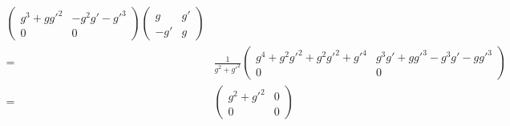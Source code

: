 \begin{frame}
\begin{align}
\begin{pmatrix}
    g^3+g{g'}^2 & -g^2g'-{g'}^3\\
    0   &0
  \end{pmatrix}
\begin{pmatrix}
    g   & g'\\
    -g' & g
  \end{pmatrix}\nonumber\\
=&\frac{1}{g^2+{g'}^2}
  \begin{pmatrix}
    g^4+g^2{g'}^2+g^2{g'}^2+{g'}^4 & g^3g'+g{g'}^3-g^3g'-g{g'}^3\\
    0    &0
  \end{pmatrix}\nonumber\\
=&\begin{pmatrix}
    g^2+{g'}^2 & 0\\
    0    &0
  \end{pmatrix}
\end{align}



\end{frame}

